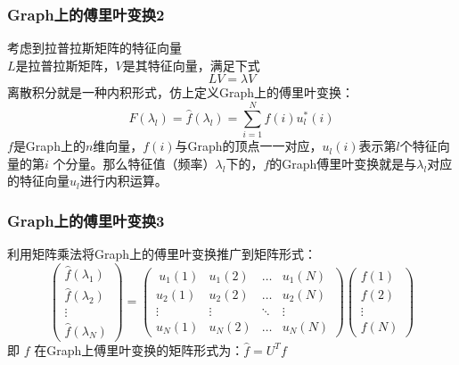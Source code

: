 \documentclass{beamer}
\begin{document}
\begin{frame}
    \frametitle{Graph上的傅里叶变换2}
    考虑到拉普拉斯矩阵的特征向量\\
    $L$是拉普拉斯矩阵，$V$是其特征向量，满足下式
    $$LV=\lambda V$$
    离散积分就是一种内积形式，仿上定义Graph上的傅里叶变换：
    $$F(\lambda_l)=\hat{f}(\lambda_l)=\sum_{i=1}^{N}{f(i) u_l^*(i)}$$
    $f$是Graph上的$n$维向量，$f(i)$与Graph的顶点一一对应，$u_l(i)$表示第$l$个特征向量的第$i$ 个分量。那么特征值（频率）$\lambda_l$下的，$f$的Graph傅里叶变换就是与$\lambda_l$对应的特征向量$u_l$进行内积运算。
\end{frame}

\begin{frame}
    \frametitle{Graph上的傅里叶变换3}
    利用矩阵乘法将Graph上的傅里叶变换推广到矩阵形式：
     $$\left(\begin{matrix} \hat{f}(\lambda_1)\\ \hat{f}(\lambda_2) \\ \vdots \\\hat{f}(\lambda_N) \end{matrix}\right)=\left(\begin{matrix}\ u_1(1) &u_1(2)& \dots &u_1(N) \\u_2(1) &u_2(2)& \dots &u_2(N)\\ \vdots &\vdots &\ddots & \vdots\\ u_N(1) &u_N(2)& \dots &u_N(N) \end{matrix}\right)\left(\begin{matrix}f(1)\\ f(2) \\ \vdots \\f(N) \end{matrix}\right)$$
    即 $f$ 在Graph上傅里叶变换的矩阵形式为：$\hat{f}=U^Tf$
\end{frame}
\end{document}
